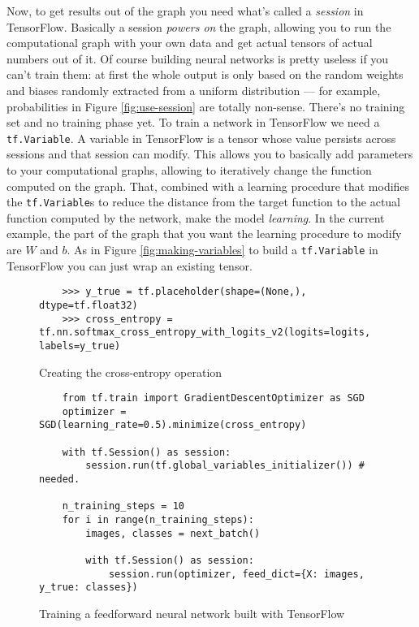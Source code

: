 Now, to get results out of the graph you need what's called a
\emph{session} in TensorFlow. Basically a session \emph{powers on} the
graph, allowing you to run the computational graph with your own data
and get actual tensors of actual numbers out of it. Of course building
neural networks is pretty useless if you can't train them: at first the
whole output is only based on the random weights and biases randomly
extracted from a uniform distribution --- for example, probabilities in
Figure \ref{fig:use-session} are totally non-sense. There's no training
set and no training phase yet. To train a network in TensorFlow we need
a \texttt{tf.Variable}. A variable in TensorFlow is a tensor whose
value persists across sessions and that session can modify. This allows
you to basically add parameters to your computational graphs, allowing
to iteratively change the function computed on the graph. That,
combined with a learning procedure that modifies the
\texttt{tf.Variable}s to reduce the distance from the target function
to the actual function computed by the network, make the model
\emph{learning}. In the current example, the part of the graph that you
want the learning procedure to modify are $W$ and $b$. As in Figure
\ref{fig:making-variables} to build a \texttt{tf.Variable} in
TensorFlow you can just wrap an existing tensor.

\begin{figure}
  \begin{verbatim}
    >>> y_true = tf.placeholder(shape=(None,), dtype=tf.float32)
    >>> cross_entropy = tf.nn.softmax_cross_entropy_with_logits_v2(logits=logits, labels=y_true)
  \end{verbatim}
  \caption{Creating the cross-entropy operation}
  \label{fig:cross-entropy}
\end{figure}

\begin{figure}
  \begin{verbatim}
    from tf.train import GradientDescentOptimizer as SGD
    optimizer = SGD(learning_rate=0.5).minimize(cross_entropy)

    with tf.Session() as session:
        session.run(tf.global_variables_initializer()) # needed.

    n_training_steps = 10
    for i in range(n_training_steps):
        images, classes = next_batch()

        with tf.Session() as session:
            session.run(optimizer, feed_dict={X: images, y_true: classes})
  \end{verbatim}
  \caption{Training a feedforward neural network built with TensorFlow}
  \label{fig:training-network}
\end{figure}


